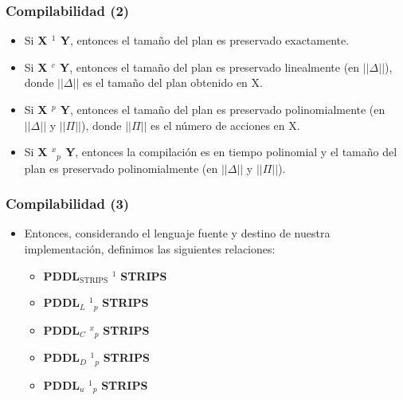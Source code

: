 \documentclass[bigger]{beamer}
\begin{document}
\begin{frame}[<+->]
\frametitle{Compilabilidad (2)}
\label{sec-5.4}
\begin{itemize}

\item Si \textbf{X \preccurlyeq$^{1}$ Y}, entonces el tamaño del plan es preservado exactamente.\\
\label{sec-5.4.1}%
\item Si \textbf{X \preccurlyeq$^{c}$ Y}, entonces el tamaño del plan es preservado linealmente (en $||\Delta||$), donde $||\Delta||$ es el tamaño del plan obtenido en X.\\
\label{sec-5.4.2}%
\item Si \textbf{X \preccurlyeq$^{p}$ Y}, entonces el tamaño del plan es preservado polinomialmente (en $||\Delta||$ y $||\Pi||$), donde $||\Pi||$ es el número de acciones en X.\\
\label{sec-5.4.3}%
\item Si \textbf{X \preccurlyeq$^{x}$$_{p}$ Y}, entonces la compilación es en tiempo polinomial y el tamaño del plan es preservado polinomialmente (en $||\Delta||$ y $||\Pi||$).\\
\label{sec-5.4.4}%
\end{itemize} %
\end{frame}
\begin{frame}[<+->]
\frametitle{Compilabilidad (3)}
\label{sec-5.5}
\begin{itemize}

\item Entonces, considerando el lenguaje fuente y destino de nuestra implementación, definimos las siguientes relaciones:
\label{sec-5.5.1}%
\begin{itemize}

\item \textbf{PDDL$_{\mathrm{STRIPS}}$} \preccurlyeq$^{1}$ \textbf{STRIPS}\\
\label{sec-5.5.1.1}%
\item \textbf{PDDL$_{L}$} \preccurlyeq$^{1}$$_{p}$ \textbf{STRIPS}\\
\label{sec-5.5.1.2}%
\item \textbf{PDDL$_{C}$} \preccurlyeq$^{x}$$_{p}$ \textbf{STRIPS}\\
\label{sec-5.5.1.3}%
\item \textbf{PDDL$_{D}$} \preccurlyeq$^{1}$$_{p}$ \textbf{STRIPS}\\
\label{sec-5.5.1.4}%
\item \textbf{PDDL$_{u}$} \preccurlyeq$^{1}$$_{p}$ \textbf{STRIPS}\\
\label{sec-5.5.1.5}%
\end{itemize} %
\end{itemize} %
\end{frame}
\end{document}
